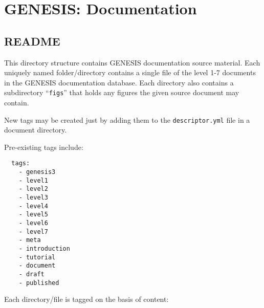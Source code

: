 \documentclass[12pt]{article}
\begin{document}
\section*{GENESIS: Documentation}

\subsection*{README}


This directory structure contains GENESIS documentation source material. Each uniquely named folder/directory contains a single file of the level 1-7 documents in the GENESIS documentation database. Each directory also contains a subdirectory ``{\tt figs}'' that holds any figures the given source document may contain.

New tags may be created just by adding them to the {\tt descriptor.yml} file in a document directory. 

Pre-existing tags include:
\begin{verbatim}
  tags:
    - genesis3
    - level1
    - level2
    - level3
    - level4
    - level5
    - level6
    - level7
    - meta
    - introduction
    - tutorial
    - document
    - draft
    - published
\end{verbatim}
Each directory/file is tagged on the basis of content:
\end{document}

